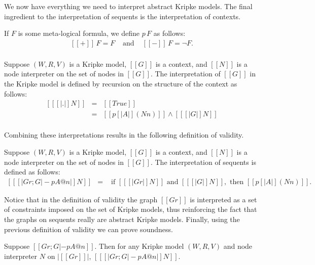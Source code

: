 We now have everything we need to interpret abstract Kripke
models. The final ingredient to the interpretation of sequents is the
interpretation of contexts.  
\begin{definition}
  \label{def:pol_interp}
  If $F$ is some meta-logical formula, we define $p\, F$ as follows:
  \[
  \begin{array}{lll}
    [[+]]\, F = F & \text{ and } &
    [[-]]\, F = \lnot F.\\
  \end{array}
  \]
\end{definition}
\begin{definition}
  \label{def:ctx_interp}
  Suppose $(W, R, V)$ is a Kripke model, $[[G]]$ is a context, 
  and $[[N]]$ is a node interpreter on the set of nodes in $[[G]]$.
  The interpretation of
  $[[G]]$ in the Kripke model is defined by recursion on the structure
  of the context as follows:
  \[
  \begin{array}{lll}
    [[ [| . |] N ]]        & = & [[True]]\\
    [[ [| p A @ n, G |] N]] & = & [[ p [| A |] (N n) ]] \land [[ [| G |] N]]\\
  \end{array}
  \]
\end{definition}
Combining these interpretations results in the following
definition of validity.
\newpage
\begin{definition}
  \label{def:validity}
  Suppose $(W, R, V)$ is a Kripke model, $[[G]]$ is a context, 
  and $[[N]]$ is a node interpreter on the set of nodes in $[[G]]$.
  The interpretation of sequents is defined as follows:
  \[
  \begin{array}{lll}
    [[ [|Gr ; G |- p A @ n |] N ]] & = & \text{ if } [[ [| Gr |] N ]] \text{ and } [[ [| G |] N]], \text{ then } [[ p [| A |] (N n)]].
  \end{array}
  \]
\end{definition}
Notice that in the definition of validity the graph $[[Gr]]$ is
interpreted as a set of constraints imposed on the set of Kripke models, thus
reinforcing the fact that the graphs on sequents really are abstract
Kripke models.  Finally, using the previous definition of validity we
can prove soundness.
\begin{thm}[Soundness]
  \label{thm:consistency}
  Suppose $[[Gr ; G |-p A @ n]]$. 
  Then for any Kripke model $(W, R, V)$ and node interpreter $N$ on $|[[Gr]]|$, $[[ [|Gr ; G |- p A @ n |] N]]$.
\end{thm}

